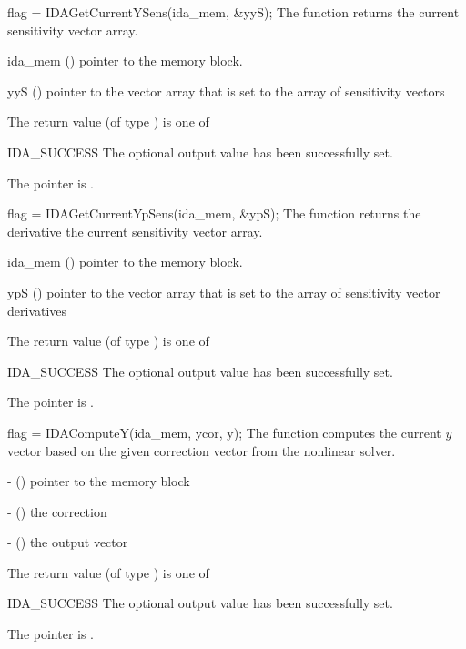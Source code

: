 {
  flag = IDAGetCurrentYSens(ida\_mem, \&yyS);
}
{
  The function  returns the current sensitivity
  vector array.
}
{
  \begin{args}
  \item[ida\_mem] ()
    pointer to the {\ida} memory block.
  \item[yyS] ()
    pointer to the vector array that is set to the array of sensitivity vectors
  \end{args}
}
{
  The return value  (of type ) is one of
  \begin{args}
  \item[IDA\_SUCCESS]
    The optional output value has been successfully set.
  \item[\Id{IDA\_MEM\_NULL}]
    The  pointer is .
  \end{args}
}
{}

{
  flag = IDAGetCurrentYpSens(ida\_mem, \&ypS);
}
{
  The function  returns the derivative the current
  sensitivity vector array.
}
{
  \begin{args}
  \item[ida\_mem] ()
    pointer to the {\ida} memory block.
  \item[ypS] ()
    pointer to the vector array that is set to the array of sensitivity
    vector derivatives
  \end{args}
}
{
  The return value  (of type ) is one of
  \begin{args}
  \item[IDA\_SUCCESS]
    The optional output value has been successfully set.
  \item[\Id{IDA\_MEM\_NULL}]
    The  pointer is .
  \end{args}
}
{}

{
  flag = IDAComputeY(ida\_mem, ycor, y);
}
{
  The function computes the current $y$ vector based on the given correction
  vector from the nonlinear solver.
}
{
  \begin{args}
    \item {} - () pointer to the {\ida} memory block
    \item {} - () the correction
    \item {} - () the output vector
  \end{args}
}
{
  The return value  (of type ) is one of
  \begin{args}
  \item[IDA\_SUCCESS]
    The optional output value has been successfully set.
  \item[\Id{IDA\_MEM\_NULL}]
    The  pointer is .
  \end{args}
}
{}

